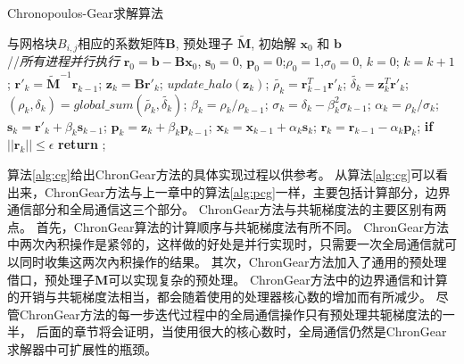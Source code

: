 \begin{algorithm}[!t]
\caption{Chronopoulos-Gear求解算法}
\label{alg:cg}
\begin{algorithmic}[1]
\REQUIRE   与网格块$B_{i,j}$相应的系数矩阵$\textbf{B}$, 预处理子 $\tilde{\textbf{M}}$, 初始解 $\textbf{x}_0$ 和 $\textbf{b}$  \\
//\qquad    \textit{所有进程并行执行}
\STATE $\textbf{r}_0 = \textbf{b}-\textbf{B}\textbf{x}_0$, $\textbf{s}_0 =0$, $\textbf{p}_0 =0$;\quad $\rho_0=1$,$\sigma_0=0$, $k=0$;
\STATE $k=k+1$;
\STATE $\textbf{r}'_{k} =\tilde{\textbf{M}}^{-1}\textbf{r}_{k-1}$; \label{pcg_scale0} 
\STATE $\textbf{z}_k = \textbf{B}\textbf{r}'_{k}$; \label{pcg_mat}
\STATE $update\_halo(\textbf{z}_{k})$;  \label{pcg_bc1}
\STATE $\tilde{\rho_k} = \textbf{r}_{k-1}^T\textbf{r}'_{k}$;\label{pcg_dot1}
\STATE $\tilde{\delta_k} = \textbf{z}_k^T\textbf{r}'_k$;\label{pcg_dot2}
\STATE $(\rho_k,\delta_k) = global\_sum(\tilde{\rho_k},\tilde{\delta_k})$;\label{pcg_global1} 
\STATE $\beta_k = \rho_k / \rho_{k-1}$;\label{pcg_beta}
\STATE $\sigma_k = \delta_k - \beta_k^2\sigma_{k-1}$;\label{pcg_sigma}
\STATE $\alpha_k = \rho_k /\sigma_{k}$;\label{pcg_alpha}
\STATE $\textbf{s}_k = \textbf{r}'_{k} +\beta_k\textbf{s}_{k-1}$;\label{pcg_scale1}
\STATE $\textbf{p}_k = \textbf{z}_{k} +\beta_k\textbf{p}_{k-1}$;\label{pcg_scale2}
\STATE $\textbf{x}_k =\textbf{x}_{k-1} +\alpha_k \textbf{s}_k$;\label{pcg_scale3}
\STATE $\textbf{r}_k =\textbf{r}_{k-1} -\alpha_k\textbf{p}_k$;\label{pcg_scale4}
\STATE \textbf{if} $||\textbf{r}_k|| \le \epsilon$  \textbf{return} ;
\ENDIF
\ENDWHILE
\end{algorithmic}
\end{algorithm}

算法\ref{alg:cg}给出ChronGear方法的具体实现过程以供参考。
从算法\ref{alg:cg}可以看出来，ChronGear方法与上一章中的算法\ref{alg:pcg}一样，主要包括计算部分，边界通信部分和全局通信这三个部分。
ChronGear方法与共轭梯度法的主要区别有两点。
首先，ChronGear算法的计算顺序与共轭梯度法有所不同。
ChronGear方法中两次內积操作是紧邻的，这样做的好处是并行实现时，只需要一次全局通信就可以同时收集这两次內积操作的结果。
其次，ChronGear方法加入了通用的预处理借口，预处理子$\textbf{M}$可以实现复杂的预处理。 
ChronGear方法中的边界通信和计算的开销与共轭梯度法相当，都会随着使用的处理器核心数的增加而有所减少。 
尽管ChronGear方法的每一步迭代过程中的全局通信操作只有预处理共轭梯度法的一半，
后面的章节将会证明，当使用很大的核心数时，全局通信仍然是ChronGear求解器中可扩展性的瓶颈。


